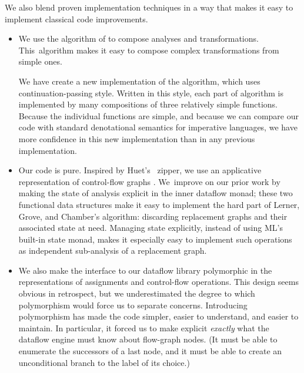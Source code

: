 \documentclass[blockstyle,preprint,natbib,nocopyrightspace]{sigplanconf}
\let\cite\citep
\def\authornote#1{\unskip\relax}
\newcommand{\simon}[1]{\authornote{SLPJ: #1}}
\def\finalremark#1{\relax}
\begin{document}
We also blend proven implementation techniques
in a way that
makes it easy
to implement classical code improvements.
\begin{itemize}
\item
We use the algorithm of \citet{lerner-grove-chambers:2002} to 
compose analyses and transformations.
This~algorithm makes it easy to compose complex transformations
from simple ones.

We have create a new implementation of the algorithm, which uses
continuation-passing style.
Written in this style, each part of algorithm is implemented by many
compositions of three relatively simple functions.
Because the individual functions are simple, and because we can
compare our code with standard denotational semantics for imperative
languages, we have more confidence in this new implementation than in
any previous implementation. 
\item
Our code is pure.
Inspired by Huet's~\citeyearpar{huet:zipper} zipper,
we use an applicative representation of
control-flow graphs
\cite{ramsey-dias:applicative-flow-graph}. 
We~improve on our prior work by making the state of analysis
explicit in the inner dataflow monad;
these two functional data structures make it easy to implement the hard
part of Lerner, Grove, and Chamber's algorithm: discarding replacement
graphs and their associated state at need.
Managing state explicitly, instead of
using ML's built-in state monad, 
makes it especially easy to implement such
operations as independent sub-analysis of a replacement graph. \simon{This 
last sentence is a repeat of the previous one.}
%
%
\item
We also make 
the interface to our dataflow library polymorphic in the
representations of 
assignments and control-flow operations.
%
This design seems obvious in retrospect,
but we underestimated the degree to which polymorphism would force us to
separate concerns.
Introducing polymorphism has made the code simpler, easier
to understand, and easier to maintain.\finalremark
{SLPJ: Is it possible to substantiate this claim by [more] examples?}
In particular, it forced us to make explicit \emph{exactly} what the
dataflow engine must know about flow-graph nodes.
(It must be able to enumerate the successors of a last
node, and it must be able to create an unconditional branch to the
label of its choice.)
\end{itemize}
\end{document}
